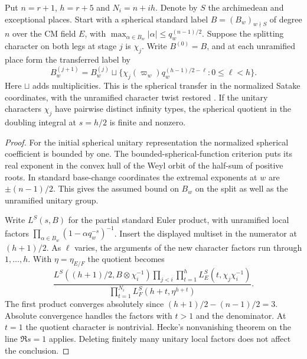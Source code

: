 \begin{auxlemma}\label{lem:fitted-core-euler}
Put \(n=r+1\), \(h=r+5\) and \(N_i=n+ih\).
Denote by \(S\) the archimedean and exceptional places. Start with a
spherical standard label \(B=(B_w)_{w\nmid S}\) of degree \(n\)
over the CM field \(E\), with
\(\max_{\alpha\in B_w}|\alpha|\le q_w^{(n-1)/2}\).
Suppose the splitting character on both legs at stage \(j\) is
\(\chi_j\). Write \(B^{(0)}=B\), and at each unramified place form
the transferred label by
\[
 B_w^{(j+1)}=B_w^{(j)}\sqcup
    \{\chi_j(\varpi_w)q_w^{(h-1)/2-\ell}:0\le\ell<h\}.
\]
Here \(\sqcup\) adds multiplicities. This is the spherical transfer
in the normalized Satake coordinates, with the unramified character
twist restored \cite[Appendix, Proposition A.5 and the split formula
following it]{liu-spherical-core}. If the unitary characters \(\chi_j\)
have pairwise distinct infinity types, the spherical quotient in the
doubling integral at \(s=h/2\) is finite and nonzero.
\end{auxlemma}
\begin{proof}
For the initial spherical unitary representation the normalized
spherical coefficient is bounded by one. The bounded-spherical-function
criterion puts its real exponent in the convex hull of the Weyl
orbit of the half-sum of positive roots. In standard base-change
coordinates the extremal exponents at \(w\) are \(\pm(n-1)/2\).
This gives the assumed bound on \(B_w\) on the split as well as the
unramified unitary group. \cite[Section 4.7]{macdonald-bounded-spherical}

Write \(L^S(s,B)\) for the partial standard Euler product, with
unramified local factors \(\prod_{\alpha\in B_w}(1-\alpha q_w^{-s})^{-1}\).
Insert the displayed multiset in the numerator at \((h+1)/2\).
As \(\ell\) varies, the arguments of the new character factors run
through \(1,\ldots,h\). With \(\eta=\eta_{E/F}\) the quotient becomes
\[
 \frac{L^S((h+1)/2,B\otimes\chi_i^{-1})
    \displaystyle\prod_{j<i}\prod_{t=1}^{h} L_E^S(t,\chi_j\chi_i^{-1})}
 {\displaystyle\prod_{t=1}^{N_i} L_F^S(h+t,\eta^{h+t})}.
\]
The first product converges absolutely since
\((h+1)/2-(n-1)/2=3\). Absolute convergence handles the factors
with \(t>1\) and the denominator. At \(t=1\) the quotient character
is nontrivial. Hecke's nonvanishing theorem on the line
\(\Re s=1\) applies. Deleting finitely many unitary local factors
does not affect the conclusion.
\end{proof}

